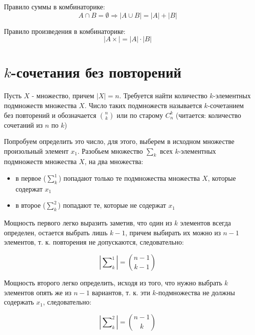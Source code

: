 \begin{Def}
	Правило суммы в комбинаторике:
	\[
		A \cap B = \emptyset \Rightarrow \left| A \cup B \right| = \left| A \right| + \left| B \right|
	\]
\end{Def}

\begin{Def}
	Правило произведения в комбинаторике:
	\[
		\left| A \times \right| = \left| A \right| \cdot \left| B \right|
	\]
\end{Def}

\section{$k$-сочетания без повторений}

Пусть $X$ - множество, причем $\left| X \right| = n$. Требуется найти количество $k$-элементных подмножеств множества $X$. Число таких подмножеств называется $k$-сочетанием без повторений и обозначается $\binom{n}{k}$ или по старому $C_n^k$ (читается: количество сочетаний из $n$ по $k$)

Попробуем определить это число, для этого, выберем в исходном множестве произольный элемент $x_1$. Разобьем множество $\sum_k$ всех $k$-элементных подмножеств множества $X$, на два множества:

\begin{itemize}
\item в первое ($\sum_k^1$) попадают только те подмножества множества $X$, которые содержат $x_1$

\item в второе ($\sum_k^2$) попадают те, которые не содержат $x_1$
\end{itemize}

Мощность первого легко выразить заметив, что один из $k$ элементов всегда определен, остается выбрать лишь $k-1$, причем выбирать их можно из $n-1$ элементов, т. к. повторения не допускаются, следовательно:

\begin{equation}
	\left| \sum\nolimits_k^1 \right| = \binom{n-1}{k-1}
\end{equation}

Мощность второго легко определить, исходя из того, что нужно выбрать $k$ элементов опять же из $n-1$ вариантов, т. к. эти $k$-подмножества не должны содержать $x_1$, следовательно:

\begin{equation}
	\left| \sum\nolimits_k^2 \right| = \binom{n-1}{k}
\end{equation}

